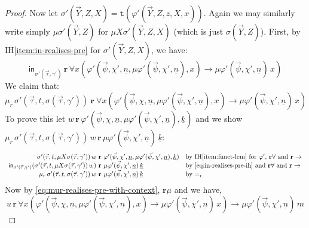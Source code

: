 \documentclass[10pt,a4paper]{amsart}
\theoremstyle{plain}
\theoremstyle{definition}
\renewcommand{\phi}{\varphi}
\theoremstyle{plain}
\theoremstyle{definition} %
\newcommand{\numeral}[1]{\underline{#1}}
\newcommand{\inj}{\mathsf{in}}
\newcommand{\injX}[1]{\inj_{#1}}
\newcommand{\rr}[1]{#1_r}
\newcommand{\reduction}{\mathrm{r}}
\newcommand{\converts}{=_{\reduction}}
\newcommand{\limp}{\to}
\newcommand{\realises}{\mathbf{r}}
\newcommand{\type}[1]{\mathtt t (#1)}
\begin{document}
\begin{proof}
    Now let $\sigma'(\vec Y,Z,X) = \type {\phi'(\vec Y,Z,z,X,x)}$. 
    Again we may similarly write simply $\mu\sigma'(\vec Y,Z)$ for $\mu X \sigma'(\vec Y,Z,X)$ (which is just $\sigma(\vec Y,Z)$).
    First, by IH\eqref{item:in-realises-pre} for $\sigma'(\vec Y,Z,X)$, we have:
    \begin{equation}
    \label{eq:in-realises-pre-ih}
        \injX{\sigma'(\vec \tau,\gamma')} \, \realises\, \forall x (\phi'(\vec \psi, \chi',\numeral n, \mu\phi'(\vec \psi,\chi',\numeral n),x) \limp \mu\phi'(\vec \psi,\chi',\numeral n)\, x)
    \end{equation}
    We claim that:
    \begin{equation}
    \label{eq:mur-realises-pre-with-context}
    \rr\mu\, \sigma'(\vec \tau,t,\sigma(\vec \tau,\gamma'))\ \realises\ 
    \forall x (\phi'(\vec \psi,\chi,\numeral n,\mu\phi'(\vec \psi,\chi',\numeral n),x) \limp \mu\phi'(\vec \psi,\chi',\numeral n)\, x)
    \end{equation}
    To prove this let $w\, \realises\, \phi'(\vec \psi, \chi,\numeral n,\mu\phi'(\vec \psi,\chi',\numeral n),\numeral k)$ and we show $ \rr\mu\, \sigma'(\vec \tau,t,\sigma(\vec \tau,\gamma'))\, w \, \realises\, \mu\phi'(\vec \psi,\allowbreak \chi',\numeral n)\, \numeral k$:
    \[
    \begin{array}{r@{\ \realises\ }ll}
         \sigma'(\vec \tau,t,\mu X \sigma(\vec \tau,\gamma')) \, w & \phi'(\vec \psi,\chi',\numeral n, \mu\phi'(\vec \psi, \chi',\numeral n), \numeral k) &\text{by IH\eqref{item:funct-lem} for $\phi'$, $\realises\forall $ and $\realises\limp$} \\
         \injX{\sigma'(\vec \tau,\gamma')} (\sigma'(\vec \tau,t,\mu X \sigma(\vec \tau,\gamma')) \, w) & \mu\phi'(\vec \psi,\chi',\numeral n)\, \numeral k & \text{by \eqref{eq:in-realises-pre-ih} and $\realises\forall$ and $\realises\limp$} \\
         \mu_r\, \sigma'(\vec \tau, t, \sigma(\vec \tau,\gamma'))\, w & \mu\phi'(\vec \psi, \chi', \numeral n)\, \numeral k & \text{by $\converts$}
    \end{array}
    \]
    Now by \eqref{eq:mur-realises-pre-with-context}, $\realises\mu$ and  we have,
    \begin{equation}
        u\, \realises\, \forall x (\phi'(\vec \psi,\chi,\numeral n,\mu\phi'(\vec \psi,\chi',\numeral n),x) \limp \mu\phi'(\vec \psi,\chi',\numeral n)\, x) \limp \mu\phi'(\vec \psi,\chi',\numeral n)\, \numeral m
    \end{equation}


\end{proof}
\end{document}
